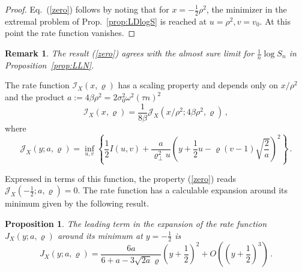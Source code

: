 \documentclass[11pt]{article}
\numberwithin{equation}{section}
\theoremstyle{plain}
\newtheorem{proposition}[theorem]{Proposition}
\newtheorem{remark}[theorem]{Remark}
\begin{document}
\begin{proof}
Eq.~(\ref{zero}) follows by noting that for $x = - \frac12\rho^2$,
the minimizer in the extremal problem of Prop.~\ref{prop:LDlogS}
is reached at $u=\rho^2, v = v_0$. At this point the rate function vanishes.
\end{proof}


\begin{remark}
The result (\ref{zero}) agrees with the almost sure limit for
$\frac{1}{n} \log S_n$ in Proposition~\ref{prop:LLN}. 
\end{remark}

The rate function $\mathcal{I}_X(x,\varrho)$ has a scaling property and depends
only on $x/\rho^2$ and the product $a:= 4\beta \rho^2=
2\sigma_0^2\omega^2 (\tau n)^2$ 
\begin{equation}\label{JXdef}
\mathcal{I}_X(x,\varrho) = \frac{1}{8\beta} 
\mathcal{J}_X\left(x/\rho^{2}; 4\beta\rho^2, \varrho\right) \,,
\end{equation}
where
\begin{equation}\label{JXinf}
\mathcal{J}_X(y;a,\varrho) = \inf_{u,v} \left\{
\frac12 I(u,v) + \frac{a}{\varrho_\perp^2 u} 
\left( y + \frac12 u - \varrho (v-1) \sqrt{\frac{2}{a}} \right)^2 
\right\}\,.
\end{equation}


Expressed in terms of this function, the property (\ref{zero}) 
reads $\mathcal{J}_X\left(-\frac12;a,\varrho\right) = 0$.
The rate function has a calculable expansion around its minimum
given by the following result.

\begin{proposition}
The leading term in the expansion of the rate function $J_X(y;a,\varrho)$ 
around its minimum at $y=-\frac12$ is
\begin{equation}\label{JXexp}
J_X(y;a,\varrho) = \frac{6a}{6+a-3\sqrt{2a} \varrho} \left(y+\frac12\right)^2 + 
O\left(\left(y+\frac12\right)^3\right)\,.
\end{equation}
\end{proposition}
\end{document}
